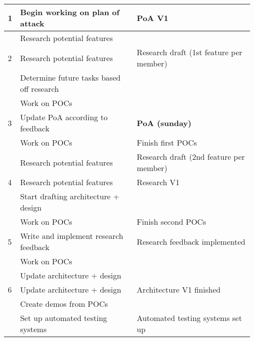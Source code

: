 \documentclass{article} %
\begin{document}
\begin{longtable}{|l|p{}|p{}|}
    1                    & Begin working on plan of attack           & PoA V1                                  \\ \hline
                         & Research potential features               &                                         \\ \hline
    2                    & Research potential features               & Research draft (1st feature per member) \\ \hline
                         & Determine future tasks based off research &                                         \\ \hline
                         & Work on POCs                              &                                         \\ \hline
    3                    & Update PoA according to feedback          & \textbf{PoA (sunday)}                   \\ \hline
                         & Work on POCs                              & Finish first POCs                       \\ \hline
                         & Research potential features               & Research draft (2nd feature per member) \\ \hline
    4                    & Research potential features               & Research V1                             \\ \hline
                         & Start drafting architecture + design      &                                         \\ \hline
                         & Work on POCs                              & Finish second POCs                      \\ \hline
    5                    & Write and implement research feedback     & Research feedback implemented           \\ \hline
                         & Work on POCs                              &                                         \\ \hline
                         & Update architecture + design              &                                         \\ \hline
    6                    & Update architecture + design              & Architecture V1 finished                \\ \hline
                         & Create demos from POCs                    &                                         \\ \hline
                         & Set up automated testing systems          & Automated testing systems set up        \\ \hline

\end{longtable}
\end{document}
